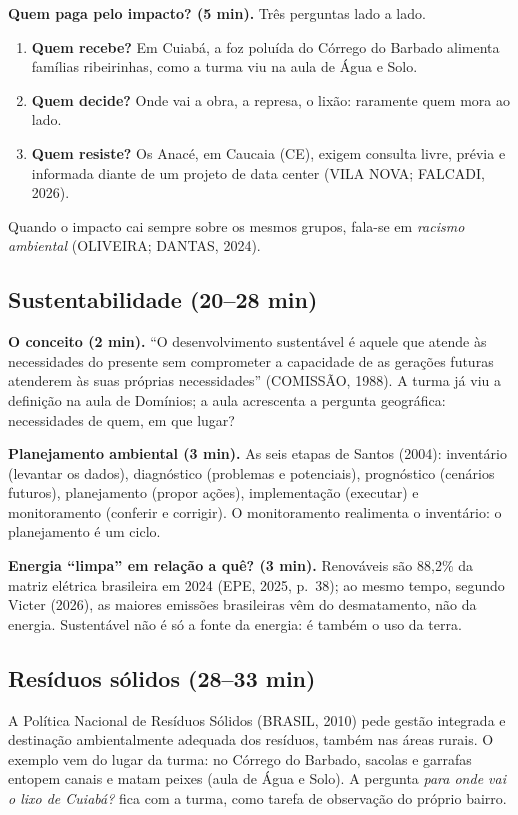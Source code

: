 \documentclass[11pt]{article}
\begin{document}
\textbf{Quem paga pelo impacto? (5 min).} Três perguntas lado a lado.
\begin{enumerate}
  \item \textbf{Quem recebe?} Em Cuiabá, a foz poluída do Córrego do Barbado alimenta famílias ribeirinhas, como a
        turma viu na aula de Água e Solo.
  \item \textbf{Quem decide?} Onde vai a obra, a represa, o lixão: raramente quem mora ao lado.
  \item \textbf{Quem resiste?} Os Anacé, em Caucaia (CE), exigem consulta livre, prévia e informada diante de um
        projeto de data center (VILA NOVA; FALCADI, 2026).
\end{enumerate}
Quando o impacto cai sempre sobre os mesmos grupos, fala-se em \emph{racismo ambiental} (OLIVEIRA; DANTAS, 2024).

\subsection{Sustentabilidade (20--28 min)}
\textbf{O conceito (2 min).} \enquote{O desenvolvimento sustentável é aquele que atende às necessidades do presente
sem comprometer a capacidade de as gerações futuras atenderem às suas próprias necessidades} (COMISSÃO, 1988). A
turma já viu a definição na aula de Domínios; a aula acrescenta a pergunta geográfica: necessidades de quem, em que
lugar?

\textbf{Planejamento ambiental (3 min).} As seis etapas de Santos (2004): inventário (levantar os dados),
diagnóstico (problemas e potenciais), prognóstico (cenários futuros), planejamento (propor ações), implementação
(executar) e monitoramento (conferir e corrigir). O monitoramento realimenta o inventário: o planejamento é um ciclo.

\textbf{Energia \enquote{limpa} em relação a quê? (3 min).} Renováveis são 88,2\% da matriz elétrica brasileira
em 2024 (EPE, 2025, p.~38); ao mesmo tempo, segundo Victer (2026), as maiores emissões brasileiras vêm do
desmatamento, não da energia. Sustentável não é só a fonte da energia: é também o uso da terra.

\subsection{Resíduos sólidos (28--33 min)}
A Política Nacional de Resíduos Sólidos (BRASIL, 2010) pede gestão integrada e destinação ambientalmente adequada
dos resíduos, também nas áreas rurais. O exemplo vem do lugar da turma: no Córrego do Barbado, sacolas e garrafas
entopem canais e matam peixes (aula de Água e Solo). A pergunta \emph{para onde vai o lixo de Cuiabá?} fica com a
turma, como tarefa de observação do próprio bairro.
\end{document}
